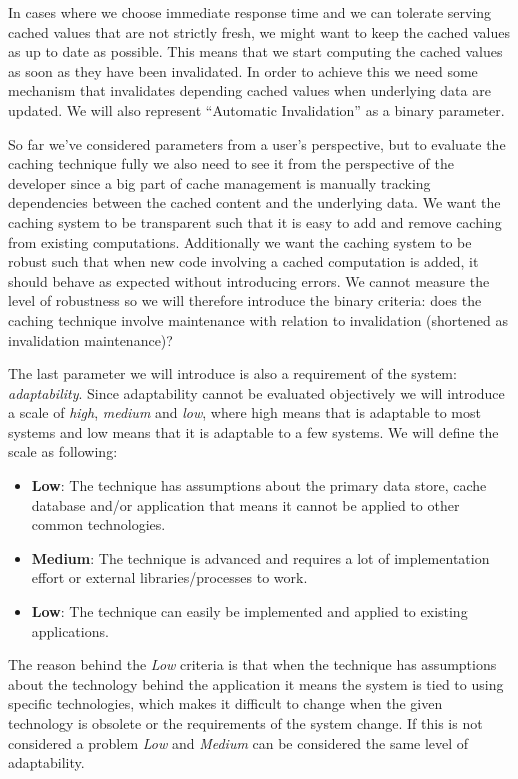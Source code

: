 In cases where we choose immediate response time and we can tolerate serving cached values that are not strictly fresh, we might want to keep the cached values as up to date as possible. This means that we start computing the cached values as soon as they have been invalidated. In order to achieve this we need some mechanism that invalidates depending cached values when underlying data are updated. We will also represent ``Automatic Invalidation'' as a binary parameter.


So far we've considered parameters from a user's perspective, but to evaluate the caching technique fully we also need to see it from the perspective of the developer since a big part of cache management is manually tracking dependencies between the cached content and the underlying data. We want the caching system to be transparent such that it is easy to add and remove caching from existing computations. Additionally we want the caching system to be robust such that when new code involving a cached computation is added, it should behave as expected without introducing errors. We cannot measure the level of robustness so we will therefore introduce the binary criteria: does the caching technique involve maintenance with relation to invalidation (shortened as invalidation maintenance)?


The last parameter we will introduce is also a requirement of the system: \emph{adaptability}. Since adaptability cannot be evaluated objectively we will introduce a scale of \emph{high}, \emph{medium} and \emph{low}, where high means that is adaptable to most systems and low means that it is adaptable to a few systems. We will define the scale as following:

\begin{itemize}
  \item \textbf{Low}: The technique has assumptions about the primary data store, cache database and/or application that means it cannot be applied to other common technologies.
  \item \textbf{Medium}: The technique is advanced and requires a lot of implementation effort or external libraries/processes to work.
  \item \textbf{Low}: The technique can easily be implemented and applied to existing applications.
\end{itemize}

The reason behind the \emph{Low} criteria is that when the technique has assumptions about the technology behind the application it means the system is tied to using specific technologies, which makes it difficult to change when the given technology is obsolete or the requirements of the system change. If this is not considered a problem \emph{Low} and \emph{Medium} can be considered the same level of adaptability.

